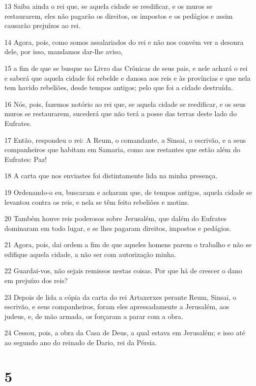 \par 13 Saiba ainda o rei que, se aquela cidade se reedificar, e os muros se restaurarem, eles não pagarão os direitos, os impostos e os pedágios e assim causarão prejuízos ao rei.
\par 14 Agora, pois, como somos assalariados do rei e não nos convém ver a desonra dele, por isso, mandamos dar-lhe aviso,
\par 15 a fim de que se busque no Livro das Crônicas de seus pais, e nele achará o rei e saberá que aquela cidade foi rebelde e danosa aos reis e às províncias e que nela tem havido rebeliões, desde tempos antigos; pelo que foi a cidade destruída.
\par 16 Nós, pois, fazemos notório ao rei que, se aquela cidade se reedificar, e os seus muros se restaurarem, sucederá que não terá a posse das terras deste lado do Eufrates.
\par 17 Então, respondeu o rei: A Reum, o comandante, a Sinsai, o escrivão, e a seus companheiros que habitam em Samaria, como aos restantes que estão além do Eufrates: Paz!
\par 18 A carta que nos enviastes foi distintamente lida na minha presença.
\par 19 Ordenando-o eu, buscaram e acharam que, de tempos antigos, aquela cidade se levantou contra os reis, e nela se têm feito rebeliões e motins.
\par 20 Também houve reis poderosos sobre Jerusalém, que dalém do Eufrates dominaram em todo lugar, e se lhes pagaram direitos, impostos e pedágios.
\par 21 Agora, pois, dai ordem a fim de que aqueles homens parem o trabalho e não se edifique aquela cidade, a não ser com autorização minha.
\par 22 Guardai-vos, não sejais remissos nestas coisas. Por que há de crescer o dano em prejuízo dos reis?
\par 23 Depois de lida a cópia da carta do rei Artaxerxes perante Reum, Sinsai, o escrivão, e seus companheiros, foram eles apressadamente a Jerusalém, aos judeus, e, de mão armada, os forçaram a parar com a obra.
\par 24 Cessou, pois, a obra da Casa de Deus, a qual estava em Jerusalém; e isso até ao segundo ano do reinado de Dario, rei da Pérsia.

\chapter{5}


